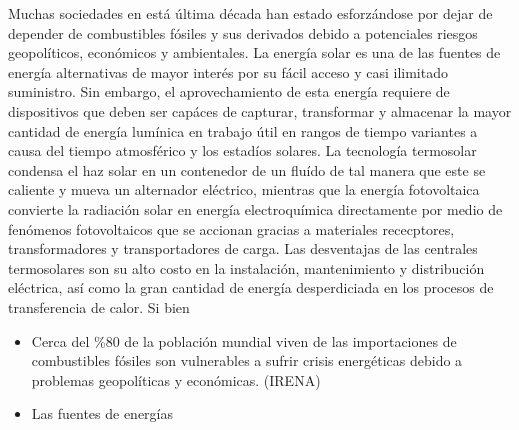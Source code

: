 Muchas sociedades en está última década han estado esforzándose por dejar de depender de combustibles
fósiles y sus derivados debido a potenciales riesgos geopolíticos, económicos y ambientales. La energía solar
es una de las fuentes de energía alternativas de mayor interés por su fácil acceso y casi ilimitado suministro.
Sin embargo, el aprovechamiento de esta energía requiere de dispositivos que deben ser capáces de capturar, transformar 
y almacenar la mayor cantidad de energía lumínica en trabajo útil en rangos de tiempo variantes a causa del tiempo atmosférico y
los estadíos solares. La tecnología termosolar condensa el haz solar en un contenedor de un fluído de tal manera que este se caliente
y mueva un alternador eléctrico, mientras que la energía fotovoltaica convierte la radiación solar en energía electroquímica directamente 
por medio de fenómenos fotovoltaicos que se accionan gracias a materiales rececptores, transformadores y transportadores de carga.
Las desventajas de las centrales termosolares son su alto costo en la instalación, mantenimiento y distribución eléctrica, así como
la gran cantidad de energía desperdiciada en los procesos de transferencia de calor. Si bien 



\begin{itemize}
    \item Cerca del \%80 de la población mundial viven de las importaciones 
     de combustibles fósiles son vulnerables a sufrir crisis energéticas
     debido a problemas geopolíticas y económicas.
     (IRENA)
    
    \item Las fuentes de energías 
\end{itemize}

